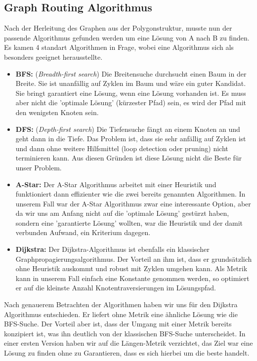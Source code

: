 \subsection{Graph Routing Algorithmus}
Nach der Herleitung des Graphen aus der Polygonstruktur, musste nun der passende Algorithmus gefunden werden um eine Lösung von A nach B zu finden. Es kamen 4 standart Algorithmen in Frage, wobei eine Algorithmus sich als besonders geeignet herausstellte.
\begin{itemize}
	\item{\textbf{BFS:} (\textit{Breadth-first search}) Die Breitensuche durchsucht einen Baum in der Breite. Sie ist unanfällig auf Zyklen im Baum und wäre ein guter Kandidat. Sie bringt garantiert eine Lösung, wenn eine Lösung vorhanden ist. Es muss aber nicht die 'optimale Lösung' (kürzester Pfad) sein, es wird der Pfad mit den wenigsten Knoten sein. \cite{AiClass}}
	\item{\textbf{DFS:} (\textit{Depth-first search}) Die Tiefensuche fängt an einem Knoten an und geht dann in die Tiefe. Das Problem ist, dass sie sehr anfällig auf Zyklen ist und dann ohne weitere Hilfsmittel (loop detection oder pruning) nicht terminieren kann. Aus diesen Gründen ist diese Lösung nicht die Beste für unser Problem. \cite{AiClass}}
	\item{\textbf{A-Star:} Der A-Star Algorithmus arbeitet mit einer Heuristik und funktioniert dann effizienter wie die zwei bereits genannten Algorithmen. In unserem Fall war der A-Star Algorithmus zwar eine interessante Option, aber da wir uns am Anfang nicht auf die 'optimale Lösung' gestürzt haben, sondern eine 'garantierte Lösung' wollten, war die Heuristik und der damit verbunden Aufwand, ein Kriterium dagegen. \cite{AiClass}}
	\item{\textbf{Dijkstra:} Der Dijkstra-Algorithmus ist ebenfalls ein klassischer Graphpropagierungsalgorithmus. Der Vorteil an ihm ist, dass er grundsätzlich ohne Heuristik auskommt und robust mit Zyklen umgehen kann. Als Metrik kann in unserem Fall einfach eine Konstante genommen werden, so optimiert er auf die kleinste Anzahl Knotentraversierungen im Lösungspfad.}
\end{itemize}
Nach genauerem Betrachten der Algorithmen haben wir uns für den Dijkstra Algorithmus entschieden. Er liefert ohne Metrik eine ähnliche Lösung wie die BFS-Suche. Der Vorteil aber ist, dass der Umgang mit einer Metrik bereits konzipiert ist, was ihn deutlich von der klassischen BFS-Suche unterscheidet.
In einer ersten Version haben wir auf die Längen-Metrik verzichtet, das Ziel war eine Lösung zu finden ohne zu Garantieren, dass es sich hierbei um die beste handelt.

